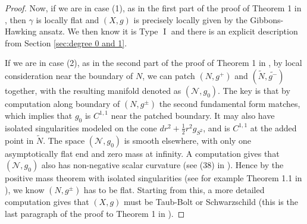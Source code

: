 \documentclass[a4paper,11pt]{amsart}
\theoremstyle{definition}
\numberwithin{equation}{section}
\DeclareMathOperator{\I}{I}
\begin{document}
\begin{proof}
    Now, if we are in case (1), as in the first part of the proof of Theorem 1 in \cite{MarsSimon}, then $\gamma$ is locally flat and $(X,g)$ is precisely locally given by the Gibbons-Hawking ansatz. We then know it is Type $\I$ and  there is an explicit description from Section \ref{sec:degree 0 and 1}.

    If we are in case  (2), as in the second part of the proof of Theorem 1 in \cite{MarsSimon}, by local consideration near the boundary of $N$, we can patch $(N,g^{+})$ and $(\widetilde N,\widetilde{g^-})$ together, with the resulting manifold denoted as $(\mathcal{N},g_0)$. The key is that by computation along boundary of $(N,g^{\pm})$ the second fundamental form matches, which implies that $g_0$ is $C^{1,1}$ near the patched boundary. It may also have isolated singularities modeled on the cone $dr^2+\frac{1}{2}r^2g_{S^2}$, and is $C^{1,1}$ at the added point in $\widetilde N$. The space $(\mathcal{N},g_0)$ is smooth elsewhere, with only one asymptotically flat end and zero mass at infinity. A computation gives that $(\mathcal{N},g_0)$ also has non-negative scalar curvature (see (38) in \cite{MarsSimon}). Hence by the positive mass theorem with isolated singularities (see for example Theorem 1.1 in \cite{Dai}), we know $(N,g^{\pm})$ has to be flat. Starting from this, a more detailed computation gives that $(X,g)$ must be Taub-Bolt or Schwarzschild (this is the last paragraph of the proof to Theorem 1 in \cite{MarsSimon}).
\end{proof}







\end{document}
